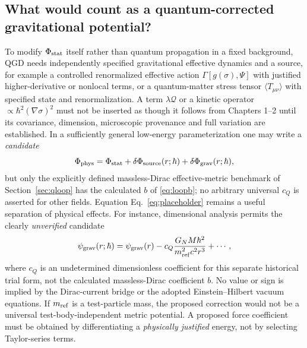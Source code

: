 \documentclass[11pt,a4paper]{article}
\theoremstyle{remark}
\newcommand{\eref}[1]{Eq.~\eqref{#1}}
\begin{document}
\subsection{What would count as a quantum-corrected gravitational potential?}
To modify $\Phi_{\rm stat}$ itself rather than quantum propagation in a fixed background, QGD needs independently specified gravitational effective dynamics and a source, for example a controlled renormalized effective action $\Gamma[g(\sigma),\Psi]$ with justified higher-derivative or nonlocal terms, or a quantum-matter stress tensor $\langle T_{\mu\nu}\rangle$ with specified state and renormalization. A term $\lambda\mathcal Q$ or a kinetic operator $\propto\hbar^2(\nabla\sigma)^2$ must not be inserted as though it follows from Chapters 1--2 until its covariance, dimension, microscopic provenance and full variation are established. In a sufficiently general low-energy parameterization one may write a \emph{candidate}
\begin{equation}\label{eq:placeholder}
 \Phi_{\rm phys}=\Phi_{\rm stat}+\delta\Phi_{\rm source}(r;\hbar)
 +\delta\Phi_{\rm grav}(r;\hbar),
\end{equation}
but only the explicitly defined massless-Dirac effective-metric benchmark of Section~\ref{sec:qloop} has the calculated $b$ of \eqref{eq:loopb}; no arbitrary universal $c_Q$ is asserted for other fields. Equation \eref{eq:placeholder} remains a useful separation of physical effects.
For instance, dimensional analysis permits the clearly \emph{unverified} candidate
\begin{equation}\label{eq:psi-quantum-hypothesis}
\psi_{\rm grav}(r;\hbar)=\psi_{\rm grav}(r)
-c_Q\frac{G_NM\hbar^2}{m_{\rm ref}^2c^2r^3}+\cdots,
\end{equation}
where $c_Q$ is an undetermined dimensionless coefficient for this separate historical trial form, not the calculated massless-Dirac coefficient $b$. No value or sign
is implied by the Dirac-current bridge or the adopted Einstein--Hilbert
vacuum equations. If $m_{\rm ref}$ is a test-particle mass, the proposed
correction would not be a universal test-body-independent metric potential.
A proposed force coefficient must be obtained by differentiating a
\emph{physically justified} energy, not by selecting Taylor-series terms.
\end{document}
